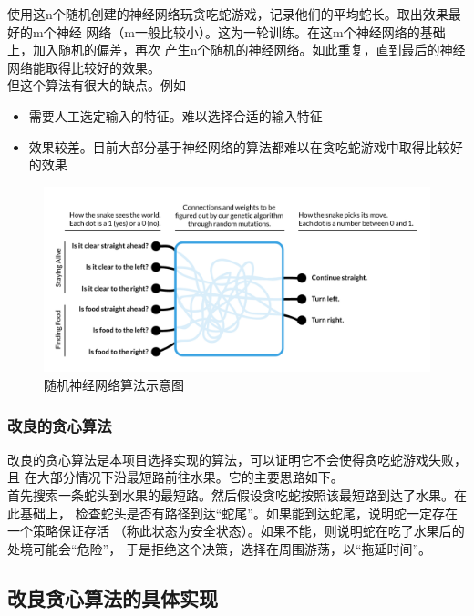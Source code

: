 \documentclass[a4paper]{article}
\begin{document}
使用这n个随机创建的神经网络玩贪吃蛇游戏，记录他们的平均蛇长。取出效果最好的m个神经
网络（m一般比较小）。这为一轮训练。在这m个神经网络的基础上，加入随机的偏差，再次
产生n个随机的神经网络。如此重复，直到最后的神经网络能取得比较好的效果。\\

但这个算法有很大的缺点。例如
\begin{itemize}
    \item 需要人工选定输入的特征。难以选择合适的输入特征
    \item 效果较差。目前大部分基于神经网络的算法都难以在贪吃蛇游戏中取得比较好的效果
\end{itemize}
\begin{figure}[!hbt]
    \begin{center}
    \includegraphics[scale=0.3]{assets/random-network.png}
    \caption{随机神经网络算法示意图\label{fig:random-network}} 
    \end{center} 
\end{figure} 

\subsubsection{改良的贪心算法}\label{subsec:refine-greedy}
改良的贪心算法是本项目选择实现的算法，可以证明它不会使得贪吃蛇游戏失败，且
在大部分情况下沿最短路前往水果。它的主要思路如下。\\


首先搜索一条蛇头到水果的最短路。然后假设贪吃蛇按照该最短路到达了水果。在此基础上，
检查蛇头是否有路径到达``蛇尾''。如果能到达蛇尾，说明蛇一定存在一个策略保证存活
（称此状态为安全状态）。如果不能，则说明蛇在吃了水果后的处境可能会``危险''， 
于是拒绝这个决策，选择在周围游荡，以``拖延时间''。

\subsection{改良贪心算法的具体实现}
\end{document}
